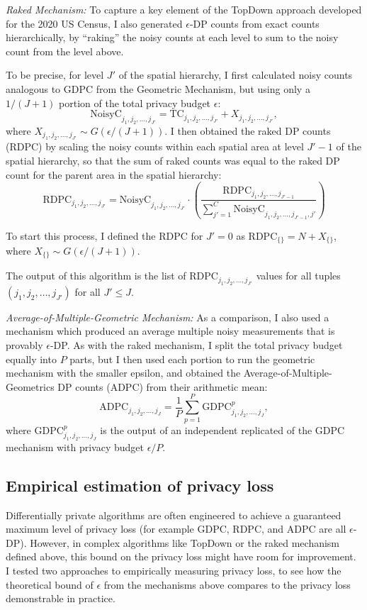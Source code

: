 \documentclass{article}
\begin{document}
\emph{Raked Mechanism:} To capture a key element of the TopDown approach developed for the 2020 US Census, I also generated $\epsilon$-DP counts from exact counts hierarchically, by ``raking'' the noisy counts at each level to sum to the noisy count from the level above.

To be precise, for level $J'$ of the spatial hierarchy, I first calculated noisy counts analogous to $\mathrm{GDPC}$ from the Geometric Mechanism, but using only a $1/(J+1)$ portion of the total privacy budget $\epsilon$:
$$
\mathrm{NoisyC}_{j_1, j_2, \ldots, j_{J'}} = \mathrm{TC}_{j_1, j_2, \ldots, j_{J'}} + X_{j_1, j_2, \ldots, j_{J'}},
$$
where $X_{j_1, j_2, \ldots, j_{J'}} \sim G(\epsilon/(J+1))$.
I then obtained the raked DP counts (RDPC) by scaling the noisy counts within each spatial area at level $J'-1$ of the spatial hierarchy, so that the sum of raked counts was equal to the raked DP count for the parent area in the spatial hierarchy:
$$
\mathrm{RDPC}_{j_1, j_2, \ldots, j_{J'}} = 
\mathrm{NoisyC}_{j_1, j_2, \ldots, j_{J'}}\cdot
\left(\frac
{\mathrm{RDPC}_{j_1,j_2,\ldots, j_{J'-1}}}
{\sum_{j'=1}^C \mathrm{NoisyC}_{j_1, j_2, \ldots, j_{J'-1}, j'}}
\right)
$$

To start this process, I defined the RDPC for $J' = 0$ as
$\mathrm{RDPC}_{\{\}} = N + X_{\{\}}$, where $X_{\{\}} \sim G(\epsilon/(J+1))$.

The output of this algorithm is the list of $
\mathrm{RDPC}_{j_1, j_2, \ldots, j_{J'}}$ values for all tuples $(j_1, j_2, \ldots, j_{J'})$ for all $J' \leq J$.

\emph{Average-of-Multiple-Geometric Mechanism:} As a comparison, I also used a mechanism which produced an average multiple noisy measurements that is provably $\epsilon$-DP.  As with the raked mechanism, I split the total privacy budget equally into $P$ parts, but I then used each portion to run the geometric mechanism with the smaller epsilon, and obtained the Average-of-Multiple-Geometrics DP counts (ADPC) from their arithmetic mean:
$$
\mathrm{ADPC}_{j_1,j_2,\ldots, j_{J}} =
\frac{1}{P}\sum_{p=1}^P
\mathrm{GDPC}_{j_1, j_2, \ldots, j_{J}}^p,
$$
where $\mathrm{GDPC}_{j_1, j_2, \ldots, j_{J}}^p$ is the output of an independent replicated of the GDPC mechanism with privacy budget $\epsilon/P$.

\subsection{Empirical estimation of privacy loss}
Differentially private algorithms are often engineered to achieve a guaranteed maximum level of privacy loss (for example GDPC, RDPC, and ADPC are all $\epsilon$-DP).  However, in complex algorithms like TopDown or the raked mechanism defined above, this bound on the privacy loss might have room for improvement.  I tested two approaches to empirically measuring privacy loss, to see how the theoretical bound of $\epsilon$ from the mechanisms above compares to the privacy loss demonstrable in practice.
\end{document}
